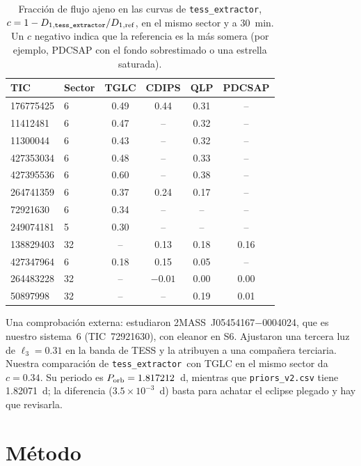 \documentclass[11pt,a4paper]{article}
\newcommand{\porb}{P_{\rm orb}}
\newcommand{\tx}{\texttt{tess\_extractor}}
\begin{document}
\begin{table}[H]
\centering
\caption{Fracción de flujo ajeno en las curvas de \tx, $c=1-D_{1,\tx}/D_{1,\rm ref}$, en el mismo
sector y a 30~min. Un $c$ negativo indica que la referencia es la más somera (por ejemplo, PDCSAP con el
fondo sobrestimado o una estrella saturada).}
\label{tab:dilucion}
\small
\begin{tabular}{llcccc}
\toprule
TIC & Sector & TGLC & CDIPS & QLP & PDCSAP \\
\midrule
176775425 & 6  & 0.49 & 0.44 & 0.31 & -- \\
11412481  & 6  & 0.47 & --   & 0.32 & -- \\
11300044  & 6  & 0.43 & --   & 0.32 & -- \\
427353034 & 6  & 0.48 & --   & 0.33 & -- \\
427395536 & 6  & 0.60 & --   & 0.38 & -- \\
264741359 & 6  & 0.37 & 0.24 & 0.17 & -- \\
72921630  & 6  & 0.34 & --   & --   & -- \\
249074181 & 5  & 0.30 & --   & --   & -- \\
138829403 & 32 & --   & 0.13 & 0.18 & 0.16 \\
427347964 & 6  & 0.18 & 0.15 & 0.05 & -- \\
264483228 & 32 & --   & $-0.01$ & 0.00 & 0.00 \\
50897998  & 32 & --   & --   & 0.19 & 0.01 \\
\bottomrule
\end{tabular}
\end{table}

Una comprobación externa: \citet{KounkelStassun2024} estudiaron 2MASS~J05454167$-$0004024, que es
nuestro sistema~6 (TIC~72921630), con eleanor en S6. Ajustaron una tercera luz de $\ell_3=0.31$ en la
banda de TESS y la atribuyen a una compañera terciaria. Nuestra comparación de \tx\ con TGLC en el mismo
sector da $c=0.34$. Su periodo es $\porb=1.817212$~d, mientras que \texttt{priors\_v2.csv} tiene
1.82071~d; la diferencia ($3.5\times10^{-3}$~d) basta para achatar el eclipse plegado y hay que revisarla.

\section{Método}
\label{sec:metodo}
\end{document}
